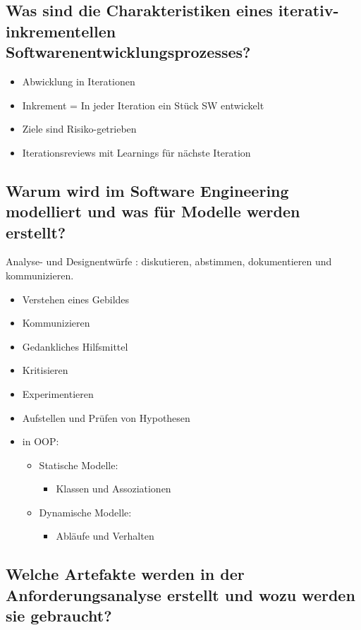 \documentclass{article}
\begin{document}
\subsection{Was sind die Charakteristiken eines iterativ-inkrementellen Softwarenentwicklungsprozesses?}
\begin{itemize}
	\item Abwicklung in Iterationen
	\item Inkrement = In jeder Iteration ein Stück SW entwickelt
	\item Ziele sind Risiko-getrieben
	\item Iterationsreviews mit Learnings für nächste Iteration
\end{itemize}



\subsection{Warum wird im Software Engineering modelliert und was für Modelle werden erstellt?}
Analyse- und Designentwürfe : diskutieren, abstimmen, dokumentieren und kommunizieren. \\
\begin{itemize}
	\item Verstehen eines Gebildes
	\item  Kommunizieren
	\item Gedankliches Hilfsmittel
	\item Kritisieren
	\item Experimentieren
	\item Aufstellen und Prüfen von Hypothesen
	\item in OOP: 
	\begin{itemize}
		\item Statische Modelle:
		\begin{itemize}
			\item Klassen und Assoziationen
		\end{itemize}
		\item Dynamische Modelle:
		\begin{itemize}
			\item Abläufe und Verhalten
		\end{itemize}
	\end{itemize}
\end{itemize}



\subsection{Welche Artefakte werden in der Anforderungsanalyse erstellt und wozu werden sie gebraucht?}
\end{document}
